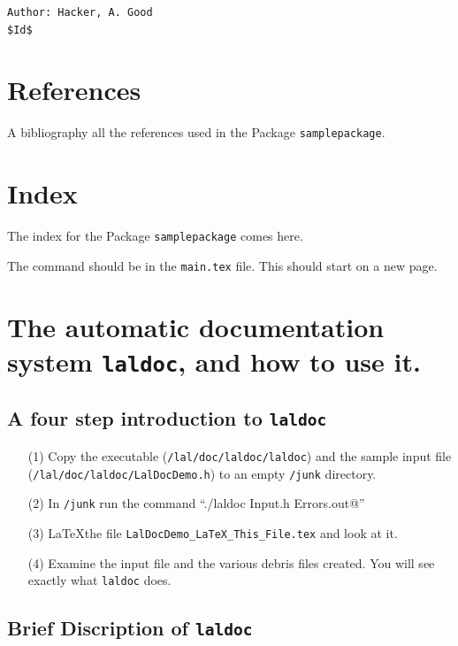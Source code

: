 \documentclass[oneside]{book}
\begin{document}
{{\vfill{\footnotesize{
\vspace{-1ex}
\mbox{}
\vspace{-3ex}
\begin{verbatim}
Author: Hacker, A. Good
$Id$
\end{verbatim}


\chapter*{References}

A bibliography all the references used in the Package {\tt samplepackage}.

\chapter*{Index}
The index for the Package {\tt samplepackage} comes here.

The \verb@\printindex@ command should be in the {\tt main.tex} file.
This should start on a new page.


\chapter{The automatic documentation system {\texttt {laldoc}}, and how to use it.}
\label{c:laldoc}

\section{A four step introduction to {\texttt {laldoc}} }

\begin{itemize}
\item[(1)] Copy the executable ({\tt /lal/doc/laldoc/laldoc}) 
and the  sample input file ({\tt /lal/doc/laldoc/LalDocDemo.h}) to an
empty  {\tt /junk} directory.
\item[(2)] In {\tt /junk} run the command ``\verb@./laldoc Input.h Errors.out@'' 
\item[(3)] \LaTeX the file {\texttt {LalDocDemo\_LaTeX\_This\_File.tex}}
and look at it.
\item[(4)] Examine the input file and the various debris files created.
You will see exactly what  {\texttt {laldoc}} does.
\end{itemize}

\section{Brief Discription of {\texttt {laldoc}} }

}}}}
\end{document}
